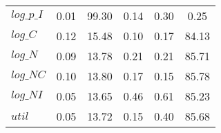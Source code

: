 \begin{center}
\begin{longtable}{lccccc}
$log\_p\_I  $	 & 	        0.01	 & 	       99.30	 & 	        0.14	 & 	        0.30	 & 	        0.25 \\ 
$log\_C     $	 & 	        0.12	 & 	       15.48	 & 	        0.10	 & 	        0.17	 & 	       84.13 \\ 
$log\_N     $	 & 	        0.09	 & 	       13.78	 & 	        0.21	 & 	        0.21	 & 	       85.71 \\ 
$log\_NC    $	 & 	        0.10	 & 	       13.80	 & 	        0.17	 & 	        0.15	 & 	       85.78 \\ 
$log\_NI    $	 & 	        0.05	 & 	       13.65	 & 	        0.46	 & 	        0.61	 & 	       85.23 \\ 
${util}     $	 & 	        0.05	 & 	       13.72	 & 	        0.15	 & 	        0.40	 & 	       85.68 \\ 
\end{longtable}
 \end{center}
